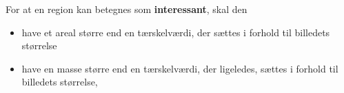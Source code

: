 \documentclass[xcolor=table]{beamer}
\begin{document}
\begin{frame}
{    \begin{definition}
        For at en region kan betegnes som \textbf{\alert{interessant}}, skal den
        \begin{itemize}
            \item have et areal større end en tærskelværdi, der sættes i
                forhold til billedets størrelse
            \item have en masse større end en tærskelværdi, der ligeledes,
                sættes i forhold til billedets størrelse,
        \end{itemize}
    \end{definition}
    }

\end{frame}
\end{document}
